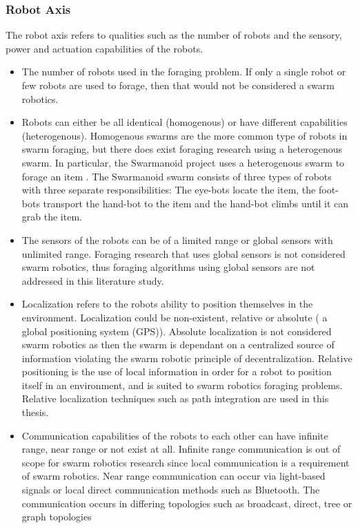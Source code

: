 \subsubsection{Robot Axis}
The robot axis refers to qualities such as  the number of robots and the sensory, power and actuation capabilities of the robots. 
\begin{itemize}
\item The number of robots used in the foraging problem. If only a single robot or few robots are used to forage, then that would not be considered a swarm robotics.

\item Robots can either be all identical (homogenous) or have different capabilities (heterogenous). Homogenous swarms are the more common type of robots in swarm foraging, but there does exist foraging research using a heterogenous swarm. In particular, the Swarmanoid project uses a heterogenous swarm to forage an item \cite{dorigo2013swarmanoid}. The Swarmanoid swarm consists of three types of robots with three separate responsibilities: The eye-bots locate the item, the foot-bots transport the hand-bot to the item and the hand-bot climbs until it can grab the item. 

\item The sensors of the robots can be of a limited range or global sensors with unlimited range. Foraging research that uses global sensors is not considered swarm robotics, thus foraging algorithms using global sensors are not addressed in this literature study.

\item Localization refers to the robots ability to position themselves in the environment. Localization could be non-existent, relative or absolute ( a global positioning system (GPS)). Absolute localization is not considered swarm robotics as then the swarm is dependant on a centralized source of information violating the swarm robotic principle of decentralization. Relative positioning is the use of local information in order for a robot to position itself in an environment, and is suited to swarm robotics foraging problems. Relative localization techniques such as path integration are used in this thesis.

\item Communication capabilities of the robots to each other can have infinite range, near range or not exist at all. Infinite range communication is out of scope for swarm robotics research since local communication is a requirement of swarm robotics. Near range communication can occur via light-based signals\cite{sugawara2002swarming} or local direct communication methods such as Bluetooth. The communication occurs in differing topologies such as broadcast, direct, tree or graph topologies \cite{dudek1993taxonomy}


\end{itemize}
